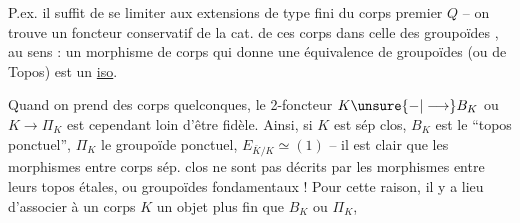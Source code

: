 P.ex. il suffit de se limiter aux extensions de type fini du corps premier $Q$ -- on trouve un foncteur conservatif de la cat. de ces corps dans celle des groupoïdes , au sens : un morphisme de corps qui donne une équivalence de groupoïdes (ou de Topos) est un \uline{iso}.


Quand on prend des corps quelconques, le 2-foncteur $K\unsure{-|\longrightarrow}B_K$ ou $K\longrightarrow\Pi_K$  est cependant loin d'être fidèle. Ainsi, si $K$ est sép clos, $B_K$ est le ``topos ponctuel'', $\Pi_K$ le groupoïde ponctuel, $E_{\bar K/K}\simeq(1)$ -- il est clair que les morphismes entre corps sép. clos ne sont pas décrits par les morphismes entre leurs topos étales, ou groupoïdes fondamentaux ! Pour cette raison, il y a lieu d'associer à un corps $K$ un objet plus fin que $B_K$ ou $\Pi_K$,
